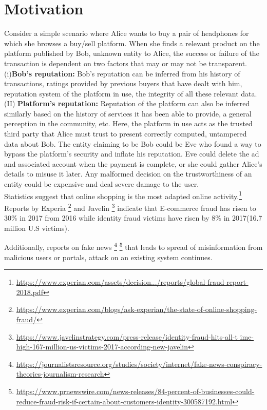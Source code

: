 \section{Motivation}
Consider a simple scenario where Alice wants to buy a pair of headphones for
which she browses a buy/sell platform. When she finds a relevant product on the
platform published by Bob, unknown entity to Alice, the success or failure of
the transaction is dependent on two factors that may or may not be transparent.\\
(i)\textbf{Bob's reputation:} Bob's reputation can be inferred from his history of
transactions, ratings provided by previous buyers that have dealt with him,
reputation system of the platform in use, the integrity of all these relevant
data. \\
(II) \textbf{Platform's reputation:} Reputation of the platform can also be inferred
similarly based on the history of services it has been able to provide, a
general perception in the community, etc. 
Here, the platform in use acts as the trusted third party that Alice must trust
to present correctly computed, untampered data about Bob. The entity claiming
to be Bob could be Eve who found a way to bypass the platform's security and
inflate his reputation. Eve could delete the ad and associated account when the
payment is complete, or she could gather Alice's details to misuse it later.
Any malformed decision on the trustworthiness of an entity could be expensive
and deal severe damage to the user.\\ 
Statistics suggest that online shopping is the most adapted online
activity.\footnote{\url{https://www.experian.com/assets/decision.../reports/global-fraud-report-2018.pdf}}
Reports by Experia
\footnote{\url{https://www.experian.com/blogs/ask-experian/the-state-of-online-shopping-fraud/}}
and Javelin
\footnote{\url{https://www.javelinstrategy.com/press-release/identity-fraud-hits-all-t
ime-high-167-million-us-victims-2017-according-new-javelin}} indicate that
E-commerce fraud has risen to 30\% in 2017 from 2016 while identity fraud
victims have risen by 8\% in 2017(16.7 million U.S victims). 

Additionally, reports on fake news
\footnote{\url{https://journalistsresource.org/studies/society/internet/fake-news-conspiracy-theories-journalism-research}}
\footnote{\url{https://www.prnewswire.com/news-releases/84-percent-of-businesses-could-reduce-fraud-risk-if-certain-about-customers-identity-300587192.html}}
that leads to spread of misinformation from malicious users or portals, attack
on an existing system continues.

